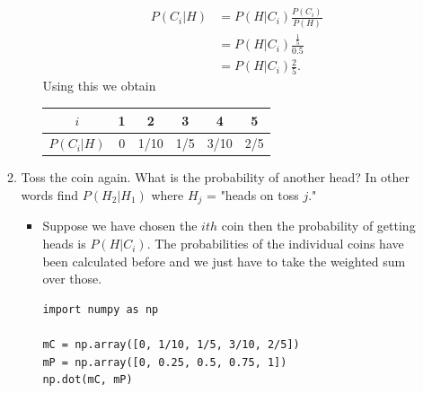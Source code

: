 \documentclass{article}
\begin{document}
\begin{enumerate}
\begin{enumerate}
\begin{itemize}
$$\begin{aligned}
				P(C_i|H) &= P(H|C_i) \frac{P(C_i)}{P(H)} \\
				&= P(H|C_i) \frac{\frac{1}{5}}{0.5} \\
				&= P(H|C_i) \frac{2}{5}.
				\end{aligned}
				$$
				Using  this we obtain
				\begin{center}
				\begin{tabular}{|c|c|c|c|c|c|}
				\hline
				$i$ & 1 & 2 & 3 & 4 & 5 \\ 
				\hline
				$P(C_i|H)$ & 0 & 1/10 & 1/5 & 3/10 & 2/5 \\
				\hline
				\end{tabular}
				\end{center}
			\end{itemize}
		\item Toss the coin again. What is the probability of another head? In other words find $P(H_2|H_1)$ where $H_j$ = "heads on toss $j$."
			\begin{itemize}
				\item Suppose we have chosen the $ith$ coin then the probability of getting heads is $P(H|C_i)$. The probabilities of the individual coins have been calculated before and we just have to take the weighted sum over those.
\begin{verbatim}
import numpy as np

mC = np.array([0, 1/10, 1/5, 3/10, 2/5])
mP = np.array([0, 0.25, 0.5, 0.75, 1])
np.dot(mC, mP)


\end{verbatim}
\end{itemize}
\end{enumerate}
\end{enumerate}
\end{document}
